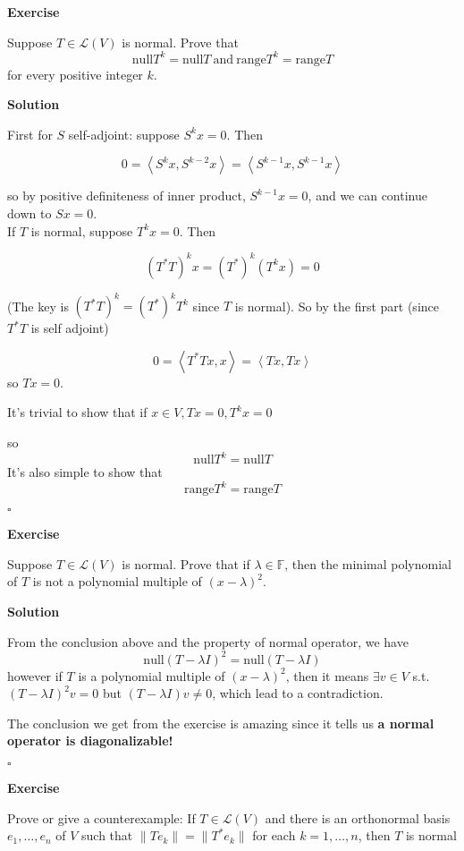 \documentclass{article}
\newenvironment{exercise}{%
{\textbf{Exercise\\}
    }
}{
}
\newenvironment{solution}{%
{
    \textbf{Solution\\}
    }
}{
  \hfill $\square$ 
  \par\bigskip 
}
\newcommand{\FF}{\mathbb{F}}
\newcommand{\range}{\text{range}}
\newcommand{\n}{\text{null}}
\begin{document}
\begin{CJK}{UTF8}{gkai}
\begin{exercise}
    Suppose $T \in \mathcal{L}(V)$ is normal. Prove that
    \[\n T^k = \n T ~\text{and}~ \range T^k = \range T\]
    for every positive integer $k$.
\end{exercise}

\begin{solution}
    First for $S$ self-adjoint: suppose $S^k x=0$. Then
   
    \[0=\left<S^k x,S^{k-2}x\right>=\left<S^{k-1}x,S^{k-1}x\right>\]
   
    so by positive definiteness of inner product, $S^{k-1}x=0$, and we can continue down to $Sx=0$.\\

    If $T$ is normal, suppose $T^kx=0$. Then
   
    \[(T^\ast T)^k x=(T^\ast )^k(T^k x) = 0\]
   
    (The key is $(T^\ast T)^k = (T^\ast )^k T^k$ since $T$ is normal). So by the first part (since $T^\ast T$ is self adjoint)
   
    \[0=\left<T^\ast Tx,x\right>=\left<Tx,Tx\right>\]
    so $Tx=0$.

    It's trivial to show that if $x \in V , Tx = 0, T^k x = 0$
   
    so
    \[\n T^k = \n T\]
    It's also simple to show that 
    \[\range T^k = \range T\]
\end{solution}

\begin{exercise}
    Suppose $T \in \mathcal{L}(V)$ is normal. Prove that if $\lambda \in \FF$, then the minimal polynomial of $T$ is not a polynomial multiple of $(x - \lambda)^2$.

\end{exercise}

\begin{solution}
    From the conclusion above and the property of normal operator, we have 
    \[\n (T - \lambda I)^2 = \n (T - \lambda I)\]
    however if $T$ is a polynomial multiple of $(x - \lambda)^2$, then it means $\exists v \in V$ s.t. $(T - \lambda I)^2 v = 0$ but $(T - \lambda I) v \neq 0$, which lead to a contradiction.

    The conclusion we get from the exercise is amazing since it tells us \textbf{a normal operator is diagonalizable!}
\end{solution}

\begin{exercise}
    Prove or give a counterexample: If $T \in \mathcal{L}(V)$ and there is an orthonormal basis $e_1, \ldots,e_n$ of $V$ such that $\|Te_k\| = \|T^\ast e_k\|$ for each $k = 1,\ldots,n$, then $T$ is normal
\end{exercise}


\end{CJK}
\end{document}
